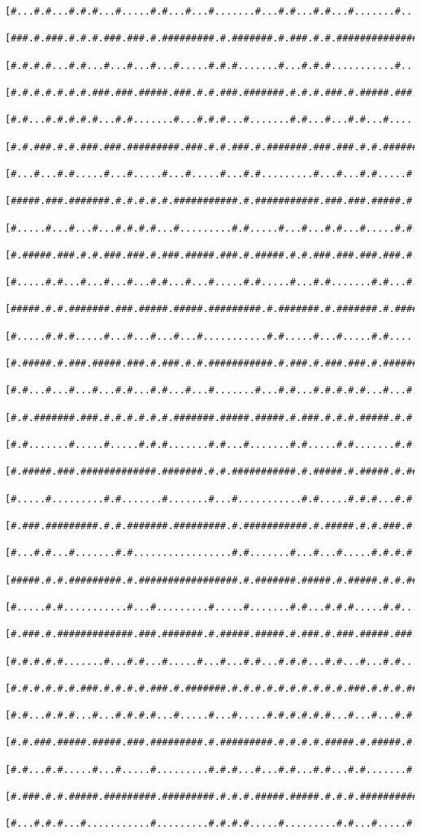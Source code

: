 \documentclass[a4paper,10pt,ngerman]{scrartcl}
\begin{document}
\begin{lstlisting}[frame=tb]
 [#...#.#...#.#.#...#.....#.#...#...#.......#...#.#...#.#...#.......#...#.#.#.#.#.#]
 [###.#.###.#.#.#.###.###.#.#########.#.#######.#.###.#.#.###############.#.#.#.#.#]
 [#.#.#.#...#.#...#...#...#...#.....#.#.#.......#...#.#.#...........#.....#.#.#.#.#]
 [#.#.#.#.#.#.#.###.###.#####.###.#.#.###.#######.#.#.#.###.#.#####.###.###.#.#.#.#]
 [#.#...#.#.#.#.#...#.#.......#...#.#.#...#.......#.#...#...#.#...#.....#.#...#.#.#]
 [#.#.###.#.#.###.###.#########.###.#.#.###.#.#######.###.###.#.#.#######.#####.#.#]
 [#...#...#.#.....#...#.....#...#.....#...#.#.........#...#...#.#.....#.......#.#.#]
 [#####.###.#######.#.#.#.#.#.###########.#.###########.###.###.#####.#.#.#####.#.#]
 [#.....#...#...#...#.#.#.#...#.........#.#.....#...#...#.#...#.....#.#.#.....#...#]
 [#.#####.###.#.#.###.###.#.###.#####.###.#.#####.#.#.###.###.###.###.#.#####.###.#]
 [#.....#.#...#...#...#...#.#...#...#.....#.#.....#...#.#.......#.#...#.....#.....#]
 [#####.#.#.#######.###.#####.#####.#########.#.#######.#.#######.#.###############]
 [#.....#.#.#.....#...#...#...#...#...........#.#.....#...#.....#.#...............#]
 [#.#####.#.###.#####.###.#.###.#.#.###########.#.###.#.###.###.#.###############.#]
 [#.#...#...#...#...#.#...#.#...#...#.......#...#.#...#.#.#.#.#...#...#...........#]
 [#.#.#######.###.#.#.#.#.#.#.#######.#####.#####.#.###.#.#.#.#####.#.#.###########]
 [#.#.......#.....#.....#.#.#.......#.#...#.......#.#.....#.#.......#.#...........#]
 [#.#####.###.#############.#######.#.#.###########.#.#####.#.#####.#.###########.#]
 [#.....#.........#.#.......#.......#...#...........#.#.....#.#.#...#.#...#.......#]
 [#.###.#########.#.#.#######.#########.#.###########.#.#####.#.#.###.#.###.#####.#]
 [#...#.#...#.......#.#.................#.#.......#...#...#.....#.#.#.#...#...#...#]
 [#####.#.#.#########.#.#################.#.#######.#####.#.#####.#.#.###.###.#.###]
 [#.....#.#...........#...#.........#.....#.......#.#...#.#.#.....#.#.....#...#...#]
 [#.###.#.#############.###.#######.#.#####.#####.#.###.#.###.#####.###.###.#######]
 [#.#.#.#.#.......#...#.#...#.....#...#...#.#...#.#.#...#.#...#...#.#...#...#.....#]
 [#.#.#.#.#.#.###.#.#.#.#.###.#.#######.#.#.#.#.#.#.#.#.#.#.###.#.#.#.###.#.#.###.#]
 [#.#...#.#.#...#...#.#.#.#...#.....#...#.....#.#.#.#.#.#...#...#...#.#...#.#.#...#]
 [#.#.###.#####.#####.###.#########.#.#########.#.#.#.#.#####.#.#####.#.#####.#.###]
 [#.#...#.#.....#...#.....#.........#.#.#...#...#.#...#.#...#.#.......#.......#...#]
 [#.###.#.#.#####.#########.#########.#.#.#.#####.#####.#.#.#.###################.#]
 [#...#.#.#...#...........#.........#.#.#.#.....#.........#.#...#.....#.....#...#.#]

\end{lstlisting}
\end{document}
